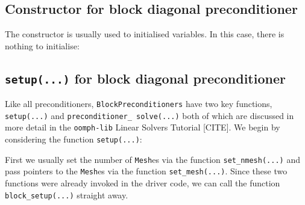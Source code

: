\subsection{Constructor for block diagonal preconditioner\label{sec:constructor_for_block_diagonal_preconditioner}}
The constructor is usually used to initialised variables. In this case, there is nothing to initialise:

\subsection{\texttt{setup(...)} for block diagonal preconditioner\label{sec:block_diagonal_preconditioner_setup}}

Like all preconditioners, \texttt{Block\allowbreak Preconditioners} have two
key functions, \texttt{setup(...)} and \texttt{preconditioner\_\allowbreak
  solve(...)} both of which are discussed in more detail in the
\texttt{oomph-\allowbreak lib} Linear Solvers Tutorial [CITE]. We begin by
considering the function \texttt{setup(...)}:
 
First we usually set the number of \texttt{Mesh}es via the function
\texttt{set\_\allowbreak nmesh(...)} and pass pointers to the \texttt{Mesh}es
via the function \texttt{set\_\allowbreak mesh(...)}. Since these two functions
were already invoked in the driver code, we can call the function
\texttt{block\_\allowbreak setup(...)} straight away.
